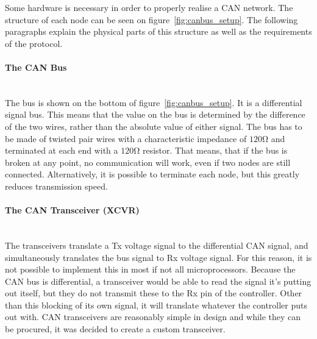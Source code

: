 Some hardware is necessary in order to properly realise a CAN network.
The structure of each node can be seen on figure~\ref{fig:canbus_setup}.
The following paragraphs explain the physical parts of this structure as well as the requirements of the protocol.


\paragraph*{The CAN Bus}~\\
The bus is shown on the bottom of figure~\ref{fig:canbus_setup}.
It is a differential signal bus.
This means that the value on the bus is determined by the difference of the two wires, rather than the absolute value of either signal.
The bus has to be made of twisted pair wires with a characteristic impedance of $\si{120 \ohm}$ and terminated at each end with a $\si{120 \ohm}$ resistor.
That means, that if the bus is broken at any point, no communication will work, even if two nodes are still connected.
Alternatively, it is possible to terminate each node, but this greatly reduces transmission speed.\\
\paragraph*{The CAN Transceiver (XCVR)}~\\
The transceivers translate a Tx voltage signal to the differential CAN signal, and simultaneously translates the bus signal to Rx voltage signal. 
For this reason, it is not possible to implement this in most if not all microprocessors.
Because the CAN bus is differential, a transceiver would be able to read the signal it's putting out itself, but they do not transmit these to the Rx pin of the controller.
Other than this blocking of its own signal, it will translate whatever the controller puts out with.
CAN transceivers are reasonably simple in design and while they can be procured, it was decided to create a custom transceiver.

